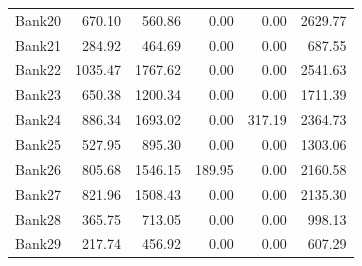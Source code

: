 \begin{longtable}{@{}lrrrrr@{}}
Bank20 & 670.10 & 560.86 & 0.00 & 0.00 & 2629.77 \\
Bank21 & 284.92 & 464.69 & 0.00 & 0.00 & 687.55 \\
Bank22 & 1035.47 & 1767.62 & 0.00 & 0.00 & 2541.63 \\
Bank23 & 650.38 & 1200.34 & 0.00 & 0.00 & 1711.39 \\
Bank24 & 886.34 & 1693.02 & 0.00 & 317.19 & 2364.73 \\
Bank25 & 527.95 & 895.30 & 0.00 & 0.00 & 1303.06 \\
Bank26 & 805.68 & 1546.15 & 189.95 & 0.00 & 2160.58 \\
Bank27 & 821.96 & 1508.43 & 0.00 & 0.00 & 2135.30 \\
Bank28 & 365.75 & 713.05 & 0.00 & 0.00 & 998.13 \\
Bank29 & 217.74 & 456.92 & 0.00 & 0.00 & 607.29 \\
\end{longtable}

